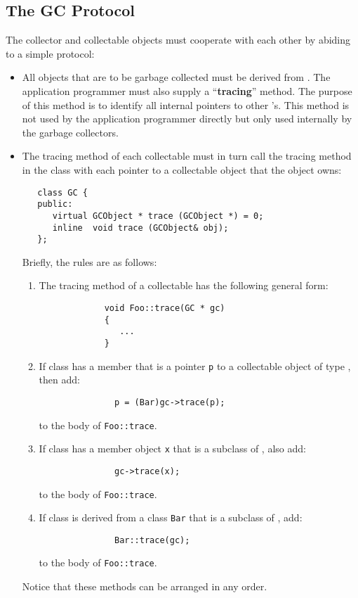 \subsection{The GC Protocol}
The collector and collectable objects must cooperate with
each other by abiding to a simple protocol:
\begin{itemize}
   \item All objects that are to be garbage collected must be derived
from .  The application programmer must also supply a
``{\bf tracing}'' method.  The purpose of this method is to identify
all internal pointers to other 's.   This method is not
used by the application programmer directly but only used internally
by the garbage collectors.
   \item The tracing method of each collectable must in turn call
    the tracing method in the class  with each pointer to
    a collectable object that the object owns:
\begin{verbatim}
   class GC {
   public:
      virtual GCObject * trace (GCObject *) = 0;
      inline  void trace (GCObject& obj);
   };
\end{verbatim}
    
     Briefly, the rules are as follows:
   \begin{enumerate}
      \item The tracing method of a collectable  has the following
         general form:
          \begin{verbatim}
             void Foo::trace(GC * gc) 
             {
                ...
             }
          \end{verbatim} 
      \item If class  has a member that is a pointer \verb|p|
            to a collectable object of type , then add:
           \begin{verbatim}
               p = (Bar)gc->trace(p);
           \end{verbatim}
            to the body of \verb|Foo::trace|. 
     \item  If class  has a member object
            \verb|x| that is a subclass of , also add:
           \begin{verbatim}
               gc->trace(x);
           \end{verbatim}
            to the body of \verb|Foo::trace|.
     \item  If class  is derived from a class \verb|Bar| that
            is a subclass of , add:
           \begin{verbatim}
               Bar::trace(gc);
           \end{verbatim}
            to the body of \verb|Foo::trace|.
   \end{enumerate} 
    Notice that these methods can be arranged in any order.
\end{itemize}

